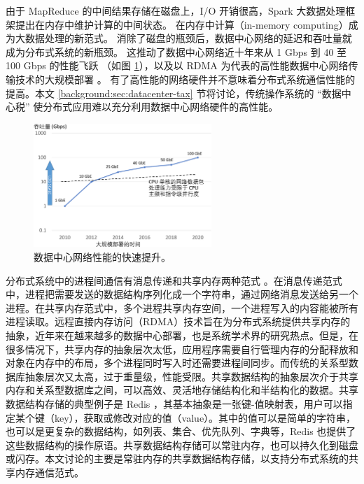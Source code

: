 由于 MapReduce 的中间结果存储在磁盘上，I/O 开销很高，Spark \cite{zaharia2010spark} 大数据处理框架提出在内存中维护计算的中间状态。
在内存中计算（in-memory computing）成为大数据处理的新范式。
消除了磁盘的瓶颈后，数据中心网络的延迟和吞吐量就成为分布式系统的新瓶颈。
这推动了数据中心网络近十年来从 1 Gbps 到 40 至 100 Gbps 的性能飞跃 \cite{al2008scalable}（如图 \ref{background:fig:network-perf-trend}），以及以 RDMA 为代表的高性能数据中心网络传输技术的大规模部署 \cite{guo2016rdma}。
有了高性能的网络硬件并不意味着分布式系统通信性能的提高。本文 \ref{background:sec:datacenter-tax} 节将讨论，传统操作系统的 ``数据中心税'' 使分布式应用难以充分利用数据中心网络硬件的高性能。


\begin{figure}[htbp]
	\centering
	\includegraphics[width=0.6\textwidth]{figures/network_perf_trend.pdf}
	\caption{数据中心网络性能的快速提升。}
	\label{background:fig:network-perf-trend}
\end{figure}



分布式系统中的进程间通信有消息传递和共享内存两种范式 \cite{kshemkalyani2011distributed}。在消息传递范式中，进程把需要发送的数据结构序列化成一个字符串，通过网络消息发送给另一个进程。在共享内存范式中，多个进程共享内存空间，一个进程写入的内容能被所有进程读取。远程直接内存访问（RDMA）技术旨在为分布式系统提供共享内存的抽象，近年来在越来越多的数据中心部署，也是系统学术界的研究热点。但是，在很多情况下，共享内存的抽象层次太低，应用程序需要自行管理内存的分配释放和对象在内存中的布局，多个进程同时写入时还需要进程间同步。而传统的关系型数据库抽象层次又太高，过于重量级，性能受限。共享数据结构的抽象层次介于共享内存和关系型数据库之间，可以高效、灵活地存储结构化和半结构化的数据。共享数据结构存储的典型例子是 Redis \cite{redis}，其基本抽象是一张键-值映射表，用户可以指定某个键（key），获取或修改对应的值（value）。其中的值可以是简单的字符串，也可以是更复杂的数据结构，如列表、集合、优先队列、字典等，Redis 也提供了这些数据结构的操作原语。共享数据结构存储可以常驻内存，也可以持久化到磁盘或闪存。本文讨论的主要是常驻内存的共享数据结构存储，以支持分布式系统的共享内存通信范式。

